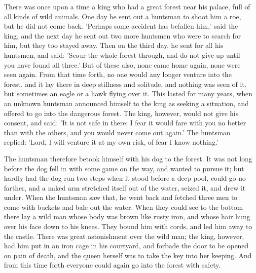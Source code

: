 \documentclass[12pt]{book}
\begin{document}
There was once upon a time a king who had a great forest near his
palace, full of all kinds of wild animals. One day he sent out a
huntsman to shoot him a roe, but he did not come back. 'Perhaps some
accident has befallen him,' said the king, and the next day he sent
out two more huntsmen who were to search for him, but they too stayed
away. Then on the third day, he sent for all his huntsmen, and said:
'Scour the whole forest through, and do not give up until you have
found all three.' But of these also, none came home again, none were
seen again. From that time forth, no one would any longer venture into
the forest, and it lay there in deep stillness and solitude, and
nothing was seen of it, but sometimes an eagle or a hawk flying over
it. This lasted for many years, when an unknown huntsman announced
himself to the king as seeking a situation, and offered to go into the
dangerous forest. The king, however, would not give his consent, and
said: 'It is not safe in there; I fear it would fare with you no
better than with the others, and you would never come out again.' The
huntsman replied: 'Lord, I will venture it at my own risk, of fear I
know nothing.'

The huntsman therefore betook himself with his dog to the forest. It
was not long before the dog fell in with some game on the way, and
wanted to pursue it; but hardly had the dog run two steps when it
stood before a deep pool, could go no farther, and a naked arm
stretched itself out of the water, seized it, and drew it under. When
the huntsman saw that, he went back and fetched three men to come with
buckets and bale out the water. When they could see to the bottom
there lay a wild man whose body was brown like rusty iron, and whose
hair hung over his face down to his knees. They bound him with cords,
and led him away to the castle. There was great astonishment over the
wild man; the king, however, had him put in an iron cage in his
courtyard, and forbade the door to be opened on pain of death, and the
queen herself was to take the key into her keeping. And from this time
forth everyone could again go into the forest with safety.
\end{document}
